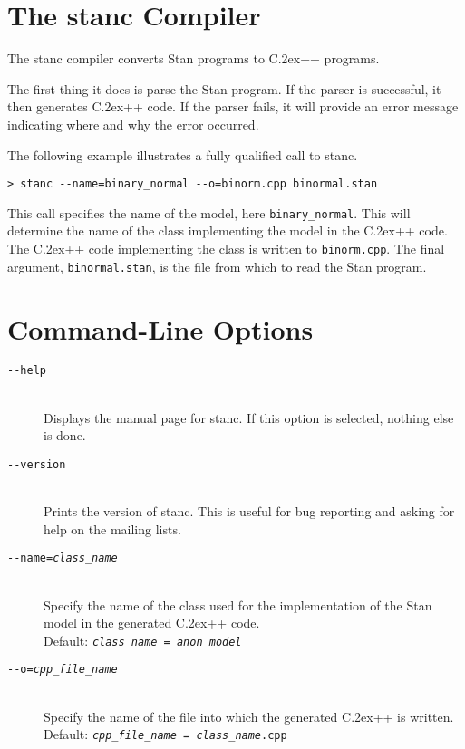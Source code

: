 \documentclass[10pt]{report}
\newcommand{\Stan}{Stan\xspace}
\newcommand{\stanc}{{\ttfamily stanc}\xspace}
\newcommand*{\Cpp}{C\raise.2ex\hbox{\footnotesize ++}\xspace} %
\newcommand{\code}[1]{{\tt #1}}
\begin{document}
\section{The \stanc Compiler}

The \stanc compiler converts \Stan programs to \Cpp programs.  

The first thing it does is parse the \Stan program.  If the parser is
successful, it then generates \Cpp code.  If the parser fails, it will
provide an error message indicating where and why the error occurred.

The following example illustrates a fully qualified call to \stanc.
%
\begin{verbatim}
> stanc --name=binary_normal --o=binorm.cpp binormal.stan 
\end{verbatim}
%
This call specifies the name of the model, here {\tt binary\_normal}.
This will determine the name of the class implementing the model in
the \Cpp code.  The \Cpp code implementing the class is written to
\code{binorm.cpp}.  The final argument, \code{binormal.stan}, is
the file from which to read the \Stan program.


\section{Command-Line Options}

\begin{description}
%
\item[\tt {-}-help] 
\mbox{ } \\ 
Displays the manual page for \stanc.  If this option is selected,
nothing else is done.
%
\item[\tt {-}-version]
\mbox{ } \\ 
Prints the version of \stanc.  This is useful for bug reporting
and asking for help on the mailing lists.
%
\item[\tt {-}-name={\slshape class\_name}]
\mbox{ } \\ 
Specify the name of the class used for the implementation of the
\Stan model in the generated \Cpp code.  
\\[6pt]
Default: {\tt {\slshape class\_name = anon\_model}}
%
\item[\tt {-}-o={\slshape cpp\_file\_name}]
\mbox{ } \\ 
Specify the name of the file into which the generated \Cpp is written.
\\[6pt]
Default: {\tt {\slshape cpp\_file\_name} = {\slshape class\_name}.cpp}
%
\end{description}
\end{document}
